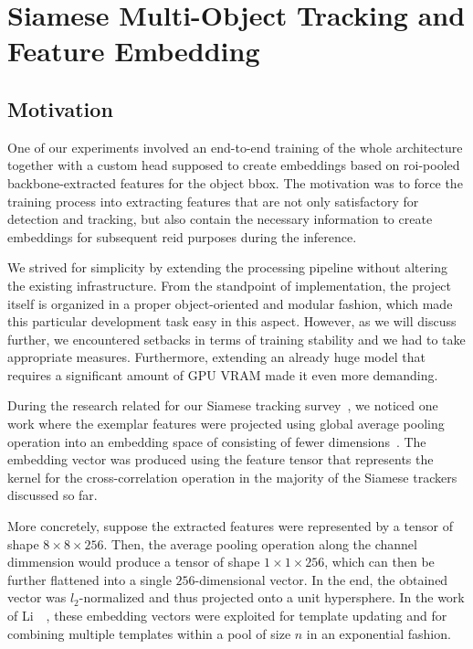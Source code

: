 \section{Siamese Multi-Object Tracking and Feature Embedding}
\label{sec:SiamMOTandFeatureEmb}

\subsection{Motivation}

One of our experiments involved an end-to-end training of the whole \siammot{} architecture together with a custom head supposed to create embeddings based on \gls{roi}-pooled backbone-extracted features for the object \gls{bbox}. The motivation was to force the training process into extracting features that are not only satisfactory for detection and tracking, but also contain the necessary information to create embeddings for subsequent \gls{reid} purposes during the inference.

We strived for simplicity by extending the processing pipeline without altering the existing infrastructure. From the standpoint of implementation, the \siammot{} project itself is organized in a proper object-oriented and modular fashion, which made this particular development task easy in this aspect. However, as we will discuss further, we encountered setbacks in terms of training stability and we had to take appropriate measures. Furthermore, extending an already huge model that requires a significant amount of GPU VRAM made it even more demanding.

During the research related for our Siamese tracking survey~\cite{ondrasovic2021siamese}, we noticed one work where the exemplar features were projected using global average pooling operation into an embedding space of consisting of fewer dimensions~\cite{li2020figsiam}. The embedding vector was produced using the feature tensor that represents the kernel for the cross-correlation operation in the majority of the Siamese trackers discussed so far.

More concretely, suppose the extracted features were represented by a tensor of shape $8 \times 8 \times 256$. Then, the average pooling operation along the channel dimmension would produce a tensor of shape $1 \times 1 \times 256$, which can then be further flattened into a single $256$-dimensional vector. In the end, the obtained vector was $l_2$-normalized and thus projected onto a unit hypersphere. In the work of Li~\etal{}~\cite{li2020figsiam}, these embedding vectors were exploited for template updating and for combining multiple templates within a pool of size $n$ in an exponential fashion.

